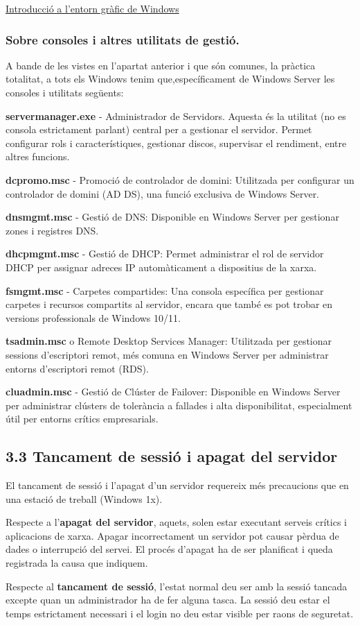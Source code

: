 \documentclass[
  a4paper,
]{article}
\begin{document}
\href{https://tofermos.github.io/Windows11/interfaces/interfaces.html}{Introducció
a l'entorn gràfic de Windows}

\subsubsection{Sobre consoles i altres utilitats de
gestió.}\label{sobre-consoles-i-altres-utilitats-de-gestiuxf3.}

A bande de les vistes en l'apartat anterior i que són comunes, la
pràctica totalitat, a tots els Windows tenim que,específicament de
Windows Server les consoles i utilitats següents:

\textbf{servermanager.exe} - Administrador de Servidors. Aquesta és la
utilitat (no es consola estrictament parlant) central per a gestionar el
servidor. Permet configurar rols i característiques, gestionar discos,
supervisar el rendiment, entre altres funcions.

\textbf{dcpromo.msc} - Promoció de controlador de domini: Utilitzada per
configurar un controlador de domini (AD DS), una funció exclusiva de
Windows Server.

\textbf{dnsmgmt.msc} - Gestió de DNS: Disponible en Windows Server per
gestionar zones i registres DNS.

\textbf{dhcpmgmt.msc} - Gestió de DHCP: Permet administrar el rol de
servidor DHCP per assignar adreces IP automàticament a dispositius de la
xarxa.

\textbf{fsmgmt.msc} - Carpetes compartides: Una consola específica per
gestionar carpetes i recursos compartits al servidor, encara que també
es pot trobar en versions professionals de Windows 10/11.

\textbf{tsadmin.msc} o Remote Desktop Services Manager: Utilitzada per
gestionar sessions d'escriptori remot, més comuna en Windows Server per
administrar entorns d'escriptori remot (RDS).

\textbf{cluadmin.msc} - Gestió de Clúster de Failover: Disponible en
Windows Server per administrar clústers de tolerància a fallades i alta
disponibilitat, especialment útil per entorns crítics empresarials.

\subsection{3.3 Tancament de sessió i apagat del
servidor}\label{tancament-de-sessiuxf3-i-apagat-del-servidor}

El tancament de sessió i l'apagat d'un servidor requereix més
precaucions que en una estació de treball (Windows 1x).

Respecte a l'\textbf{apagat del servidor}, aquets, solen estar executant
serveis crítics i aplicacions de xarxa. Apagar incorrectament un
servidor pot causar pèrdua de dades o interrupció del servei. El procés
d'apagat ha de ser planificat i queda registrada la causa que indiquem.

Respecte al \textbf{tancament de sessió}, l'estat normal deu ser amb la
sessió tancada excepte quan un administrador ha de fer alguna tasca. La
sessió deu estar el temps estrictament necessari i el login no deu estar
visible per raons de seguretat.
\end{document}
